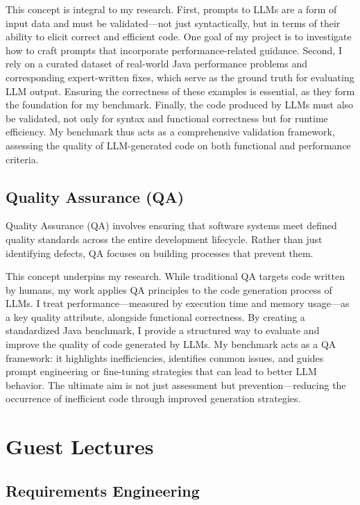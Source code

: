 \documentclass[11pt]{article}
\begin{document}
This concept is integral to my research. First, prompts to LLMs are a form of input data and must be validated—not just syntactically, but in terms of their ability to elicit correct and efficient code. One goal of my project is to investigate how to craft prompts that incorporate performance-related guidance. Second, I rely on a curated dataset of real-world Java performance problems and corresponding expert-written fixes, which serve as the ground truth for evaluating LLM output. Ensuring the correctness of these examples is essential, as they form the foundation for my benchmark. Finally, the code produced by LLMs must also be validated, not only for syntax and functional correctness but for runtime efficiency. My benchmark thus acts as a comprehensive validation framework, assessing the quality of LLM-generated code on both functional and performance criteria.

\subsection{Quality Assurance (QA)}

Quality Assurance (QA) involves ensuring that software systems meet defined quality standards across the entire development lifecycle. Rather than just identifying defects, QA focuses on building processes that prevent them.

This concept underpins my research. While traditional QA targets code written by humans, my work applies QA principles to the code generation process of LLMs. I treat performance—measured by execution time and memory usage—as a key quality attribute, alongside functional correctness. By creating a standardized Java benchmark, I provide a structured way to evaluate and improve the quality of code generated by LLMs. My benchmark acts as a QA framework: it highlights inefficiencies, identifies common issues, and guides prompt engineering or fine-tuning strategies that can lead to better LLM behavior. The ultimate aim is not just assessment but prevention—reducing the occurrence of inefficient code through improved generation strategies.

\section{Guest Lectures}

\subsection{Requirements Engineering}
\end{document}
